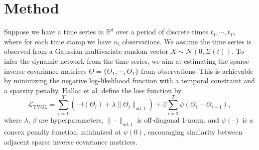 \section{Method}
Suppose we have a time series in $\mathbb{R}^d$ over a period of discrete times $t_1,\cdots,t_T$, 
where for each time stamp we have $n_i$ observations. 
We assume the time series is observed from a Gaussian multivariate random vector $X\sim\mathcal{N}(0,\Sigma(t))$. 
To infer the dynamic network from the time series, 
we aim at estimating the sparse inverse covariance matrices $\Theta=\{\Theta_1,\cdots,\Theta_T\}$ from observations. 
This is achievable by minimizing the negative log-likelihood function with a temporal constraint and a sparsity penalty.
Hallac et al. define the loss function by
\begin{equation}
    \label{eq: ch1_TVGLloss}
    \mathcal{L}_{\text{TVGL}} = \sum_{i=1}^{T}\left(-l(\Theta_i) + \lambda\|\Theta_i\|_{\text{od}, 1}\right) + \beta\sum_{i=2}^{T}\psi(\Theta_i-\Theta_{i-1}), 
\end{equation}
where $\lambda$, $\beta$ are hyperparameters, $\|\cdot\|_{\text{od}, 1}$ is off-diagonal 1-norm, 
and $\psi(\cdot)$ is a convex penalty function, minimized at $\psi(0)$, 
encouraging similarity between adjacent sparse inverse covariance matrices. 

